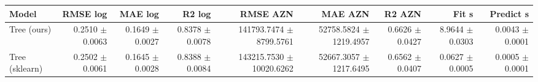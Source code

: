 \begin{tabular}{lrrrrrrrr}
\toprule
Model & RMSE log & MAE log & R2 log & RMSE AZN & MAE AZN & R2 AZN & Fit s & Predict s \\
\midrule
Tree (ours) & 0.2510 $\pm$ 0.0063 & 0.1649 $\pm$ 0.0027 & 0.8378 $\pm$ 0.0078 & 141793.7474 $\pm$ 8799.5761 & 52758.5824 $\pm$ 1219.4957 & 0.6626 $\pm$ 0.0427 & 8.9644 $\pm$ 0.0303 & 0.0043 $\pm$ 0.0001 \\
Tree (sklearn) & 0.2502 $\pm$ 0.0061 & 0.1645 $\pm$ 0.0028 & 0.8388 $\pm$ 0.0084 & 143215.7530 $\pm$ 10020.6262 & 52667.3057 $\pm$ 1217.6495 & 0.6562 $\pm$ 0.0407 & 0.0627 $\pm$ 0.0005 & 0.0005 $\pm$ 0.0001 \\
\bottomrule
\end{tabular}
